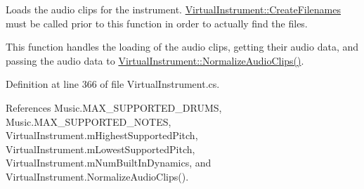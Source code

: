 Loads the audio clips for the instrument. \hyperlink{group___v_i_base_virt_func_gaacfc9521214176292bfb9665556fb991}{Virtual\+Instrument\+::\+Create\+Filenames} must be called prior to this function in order to actually find the files. 

This function handles the loading of the audio clips, getting their audio data, and passing the audio data to \hyperlink{group___v_i_base_priv_func_ga0262de8cfb1e671b01ba76de2e9d140a}{Virtual\+Instrument\+::\+Normalize\+Audio\+Clips()}. 

Definition at line 366 of file Virtual\+Instrument.\+cs.



References Music.\+M\+A\+X\+\_\+\+S\+U\+P\+P\+O\+R\+T\+E\+D\+\_\+\+D\+R\+U\+MS, Music.\+M\+A\+X\+\_\+\+S\+U\+P\+P\+O\+R\+T\+E\+D\+\_\+\+N\+O\+T\+ES, Virtual\+Instrument.\+m\+Highest\+Supported\+Pitch, Virtual\+Instrument.\+m\+Lowest\+Supported\+Pitch, Virtual\+Instrument.\+m\+Num\+Built\+In\+Dynamics, and Virtual\+Instrument.\+Normalize\+Audio\+Clips().



